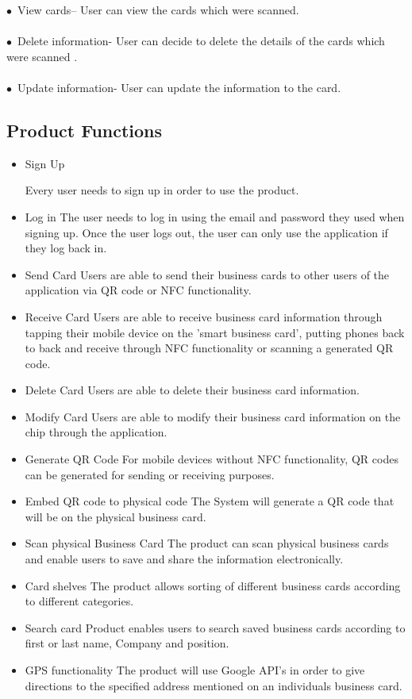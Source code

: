 \documentclass[english]{article}
\begin{document}
$\bullet$\ View cards– User can view the cards which were scanned. \\
\\$\bullet$\ Delete information- User can decide to delete the details of the cards which were scanned . \\
\\$\bullet$\ Update information- User can update the information to the card.


				\newpage
				\subsection{Product Functions}
				\begin{itemize} 
					\item Sign Up
					
					\subitem
					Every user needs to sign up in order to use the product.
					\item
					Log in
					\subitem
					The user needs to log in using the email and password they used when signing up.
					\subitem 
					Once the user logs out, the user can only use the application if they log back in.
					\item 
					Send Card
					\subitem
					Users are able to send their business cards to other users of the application via QR code or NFC 						functionality.
					\item
					Receive Card
					\subitem
					Users are able to receive business card information through tapping their mobile device on the 						'smart business card', putting phones back to back and receive through NFC functionality or 							scanning a generated QR code.
					\item 
					Delete Card
					\subitem
					Users are able to delete their business card information.
					\item
					Modify Card
					\subitem
					Users are able to modify their business card information on the chip through the application.
					\item
					Generate QR Code
					\subitem
					For mobile devices without NFC functionality, QR codes can be generated for sending or receiving 						purposes.
					\item
					Embed QR code to physical code
					\subitem
					The System will generate a QR code that will be on the physical business card.
					\item
					Scan physical Business Card
					\subitem
					The product can scan physical business cards and enable users to save and share the information 						electronically.
					\item
					Card shelves
					\subitem
					The product allows sorting of different business cards according to different categories.
					
					\item
					Search card
					\subitem
					Product enables users to search saved business cards according to first or last name, Company and 					position.
					\item
					GPS functionality	
					\subitem
					The product will use Google API's in order to give directions to the specified address mentioned on 						an individuals business card.
				\end{itemize}
\end{document}
